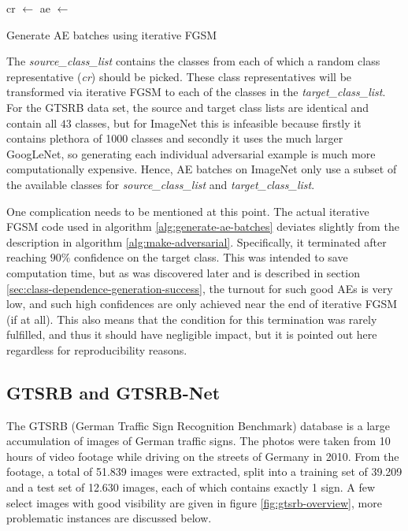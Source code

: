 \documentclass[11pt, a4paper]{article}
\begin{document}
\begin{algorithm}
	\begin{algorithmic}
				\State cr $\gets$ 
					\State ae $\gets$  
				\EndFor
			\EndFor
	\end{algorithmic}
	\caption[Generating AE batches]{Generate AE batches using iterative FGSM}
	\label{alg:generate-ae-batches}
\end{algorithm}

The \emph{source\_class\_list} contains the classes from each of which a random class representative (\emph{cr}) should be picked. These class representatives will be transformed via iterative FGSM to each of the classes in the \emph{target\_class\_list}. For the GTSRB data set, the source and target class lists are identical and contain all $43$ classes, but for ImageNet this is infeasible because firstly it contains plethora of 1000 classes and secondly it uses the much larger GoogLeNet, so generating each individual adversarial example is much more computationally expensive. Hence, AE batches on ImageNet only use a subset of the available classes for \emph{source\_class\_list} and \emph{target\_class\_list}.

One complication needs to be mentioned at this point. The actual iterative FGSM code used in algorithm \ref{alg:generate-ae-batches} deviates slightly from the description in algorithm \ref{alg:make-adversarial}. Specifically, it terminated after reaching $90\%$ confidence on the target class. This was intended to save computation time, but as was discovered later and is described in section \ref{sec:class-dependence-generation-success}, the turnout for such good AEs is very low, and such high confidences are only achieved near the end of iterative FGSM (if at all). This also means that the condition for this termination was rarely fulfilled, and thus it should have negligible impact, but it is pointed out here regardless for reproducibility reasons.

\subsection{GTSRB and GTSRB-Net}
\label{sec:generation-large-sets:gtsrb}
The GTSRB (German Traffic Sign Recognition Benchmark) database is a large accumulation of images of German traffic signs. The photos were taken from 10 hours of video footage while driving on the streets of Germany in 2010. From the footage, a total of 51.839 images were extracted, split into a training set of 39.209 and a test set of 12.630 images, each of which contains exactly 1 sign. A few select images with good visibility are given in figure \ref{fig:gtsrb-overview}, more problematic instances are discussed below.
\end{document}
